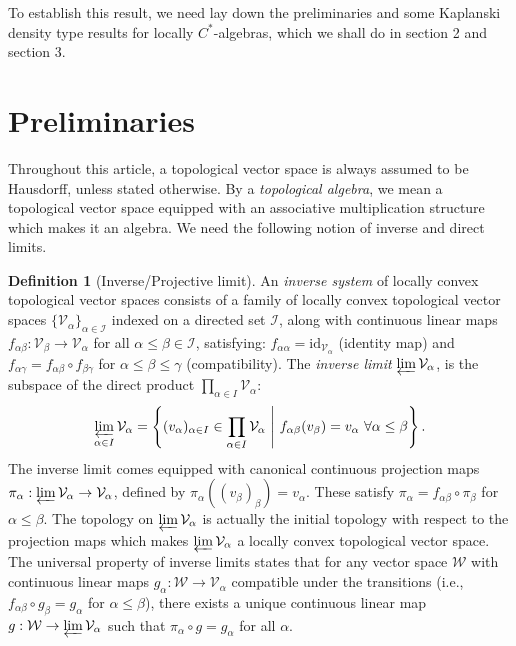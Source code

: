 \documentclass[10pt]{article}
\theoremstyle{definition}
\newtheorem{definition}{Definition}[section]
\begin{document}
	To establish this result, we need lay down the preliminaries and some Kaplanski density type results for locally $C^*$-algebras, which we shall do in section 2 and section 3.
	\section{Preliminaries}
	Throughout this article, a topological vector space is always assumed to be Hausdorff, unless stated otherwise. By a \emph{topological algebra}, we mean a topological vector space equipped with an associative multiplication structure which makes it an algebra. We need the following notion of inverse and direct limits.
	\begin{definition}[Inverse/Projective limit]
		An \emph{inverse system} of locally convex topological vector spaces consists of a family of
		 locally convex topological vector spaces $\{\mathcal{V}_\alpha\}_{\alpha\in \mathcal I}$ indexed on a directed set $\mathcal I$, along with 
			 continuous linear maps $f_{\alpha\beta}: \mathcal{V}_\beta \to \mathcal{V}_\alpha$ for all $\alpha \leq \beta \in \mathcal I$, satisfying:
			$f_{\alpha\alpha} = \mathrm{id}_{\mathcal{V}_\alpha}$ (identity map) and
			$f_{\alpha\gamma} = f_{\alpha\beta} \circ f_{\beta\gamma}$ for $\alpha \leq \beta \leq \gamma$ (compatibility).		
		The \emph{inverse limit} $\varprojlim \mathcal{V}_\alpha$, is the subspace of the direct product $\prod_{\alpha \in I} \mathcal{V}_\alpha$:
		\[
		\varprojlim_{\alpha \in I} \mathcal{V}_\alpha = \left\{ (v_\alpha)_{\alpha \in I} \in \prod_{\alpha \in I} \mathcal{V}_\alpha \ \middle|\ f_{\alpha\beta}(v_\beta) = v_\alpha \ \forall \alpha \leq \beta  \right\}.
		\]
		The inverse limit comes equipped with canonical continuous projection maps $\pi_\alpha: \varprojlim \mathcal{V}_\alpha \to \mathcal{V}_\alpha$, defined by $\pi_\alpha((v_\beta)_{\beta}) = v_\alpha$. These satisfy $\pi_\alpha = f_{\alpha\beta} \circ \pi_\beta$ for $\alpha \leq \beta$. The topology on $\varprojlim \mathcal V_\alpha$ is actually the initial topology with respect to the projection maps which makes $\varprojlim \mathcal V_\alpha$ a locally convex topological vector space.
		The universal property of inverse limits states that
		 for any vector space $\mathcal W$ with continuous linear maps $g_\alpha: \mathcal W \to \mathcal{V}_\alpha$ compatible under the transitions (i.e., $f_{\alpha\beta} \circ g_\beta = g_\alpha$ for $\alpha \leq \beta$), there exists a unique continuous linear map $g: \mathcal W \to \varprojlim \mathcal{V}_\alpha$ such that $\pi_\alpha \circ g = g_\alpha$ for all $\alpha$.
			\end{definition}
\end{document}

